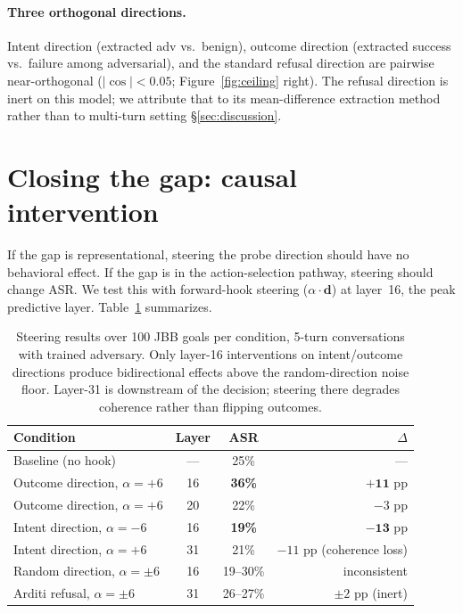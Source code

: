 \documentclass[11pt]{article}
\begin{document}
\begin{itemize}[leftmargin=1.2em,topsep=0.3ex,itemsep=0.2ex]
\paragraph{Three orthogonal directions.}
Intent direction (extracted adv vs.\ benign), outcome direction (extracted success vs.\ failure among adversarial), and the standard refusal direction \citep{arditi2024refusal} are pairwise near-orthogonal ($|\cos|<0.05$; Figure~\ref{fig:ceiling} right). The refusal direction is inert on this model; we attribute that to its mean-difference extraction method rather than to multi-turn setting \S\ref{sec:discussion}.

\section{Closing the gap: causal intervention}

If the gap is representational, steering the probe direction should have no behavioral effect. If the gap is in the action-selection pathway, steering should change ASR. We test this with forward-hook steering ($\alpha \cdot \mathbf{d}$) at layer~16, the peak predictive layer. Table~\ref{tab:steering} summarizes.

\begin{table}[h]
\centering
\small
\begin{tabular}{lccr}
\toprule
\textbf{Condition} & \textbf{Layer} & \textbf{ASR} & \textbf{$\Delta$} \\
\midrule
Baseline (no hook)                & ---   & 25\% & --- \\
Outcome direction, $\alpha=+6$    & 16    & \textbf{36\%} & $\mathbf{+11}$ pp \\
Outcome direction, $\alpha=+6$    & 20    & 22\%          & $-3$ pp \\
Intent direction, $\alpha=-6$     & 16    & \textbf{19\%} & $\mathbf{-13}$ pp \\
Intent direction, $\alpha=+6$     & 31    & 21\%          & $-11$ pp (coherence loss) \\
Random direction, $\alpha=\pm 6$  & 16    & 19--30\%      & inconsistent \\
Arditi refusal, $\alpha=\pm 6$    & 31    & 26--27\%      & $\pm 2$ pp (inert) \\
\bottomrule
\end{tabular}
\caption{Steering results over 100 JBB goals per condition, 5-turn conversations with trained adversary. Only layer-16 interventions on intent/outcome directions produce bidirectional effects above the random-direction noise floor. Layer-31 is downstream of the decision; steering there degrades coherence rather than flipping outcomes.}
\label{tab:steering}
\end{table}


\end{itemize}
\end{document}
